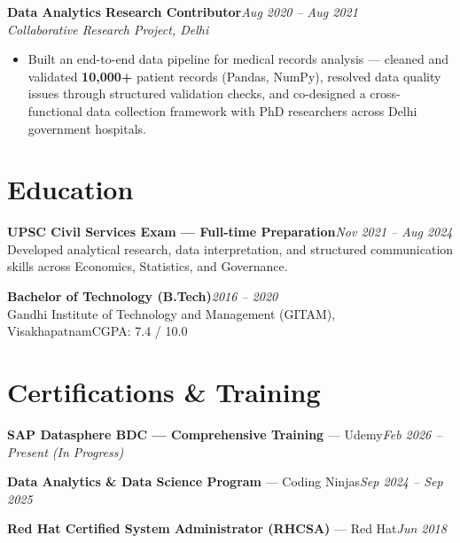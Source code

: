 \documentclass[10pt, letterpaper]{article}
\newcommand{\role}[3]{%
  \vspace{2pt}%
  {\bfseries #1}\hfill{\small\color{muted}\textit{#3}}\\[-2pt]%
  {\small\color{muted}\textit{#2}}%
}
\begin{document}
\role{Data Analytics Research Contributor}{Collaborative Research Project, Delhi}{Aug 2020 – Aug 2021}

\begin{itemize}
  \item Built an end-to-end data pipeline for medical records analysis — cleaned and validated \textbf{10,000+} patient records (Pandas, NumPy), resolved data quality issues through structured validation checks, and co-designed a cross-functional data collection framework with PhD researchers across Delhi government hospitals.
\end{itemize}


\section{Education}

{\bfseries UPSC Civil Services Exam — Full-time Preparation}\hfill{\small\color{muted}\textit{Nov 2021 – Aug 2024}}\\
{\small\color{muted}Developed analytical research, data interpretation, and structured communication skills across Economics, Statistics, and Governance.}

\vspace{2pt}
{\bfseries Bachelor of Technology (B.Tech)}\hfill{\small\color{muted}\textit{2016 – 2020}}\\
{\small\color{muted}Gandhi Institute of Technology and Management (GITAM), Visakhapatnam\hfill CGPA: 7.4 / 10.0}

\section{Certifications \& Training}

{\bfseries SAP Datasphere BDC — Comprehensive Training} — Udemy\hfill{\small\color{muted}\textit{Feb 2026 – Present \emph{(In Progress)}}}

\vspace{1pt}
{\bfseries Data Analytics \& Data Science Program} — Coding Ninjas\hfill{\small\color{muted}\textit{Sep 2024 – Sep 2025}}

\vspace{1pt}
{\bfseries Red Hat Certified System Administrator (RHCSA)} — Red Hat\hfill{\small\color{muted}\textit{Jun 2018}}

\end{document}

